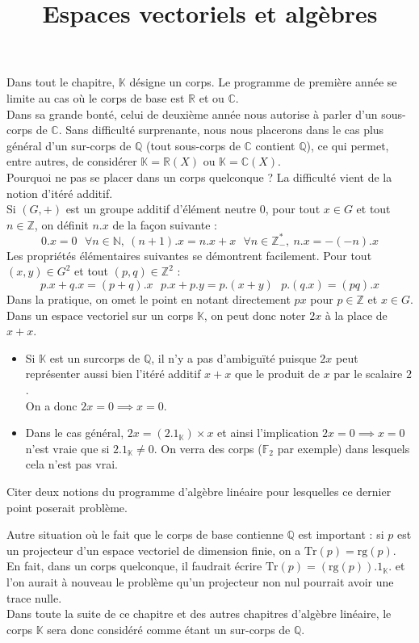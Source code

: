 \documentclass[french]{article}
\title{Espaces vectoriels et algèbres}
\date{}
\newcommand{\N}{\mathbb{N}}
\newcommand{\Z}{\mathbb{Z}}
\newcommand{\Q}{\mathbb{Q}}
\newcommand{\R}{\mathbb{R}}
\newcommand{\C}{\mathbb{C}}
\newcommand{\K}{\mathbb{K}}
\newcommand{\st}{^*}
\newcommand{\F}{\mathbb{F}}
\newcommand{\Tr}{\text{Tr}}
\newcommand{\rg}{\text{rg}}
\theoremstyle{plain}
\theoremstyle{definition}
\theoremstyle{remark}
\begin{document}
\tableofcontents

\newpage
\maketitle
Dans tout le chapitre, $\K$ désigne un corps. Le programme de première année se limite au cas où le corps de base est $\R$ et ou $\C$. \\
Dans sa grande bonté, celui de deuxième année nous autorise à parler d'un sous-corps de $\C$. Sans difficulté surprenante, nous nous placerons dans le cas plus général d'un sur-corps de $\Q$ (tout sous-corps de $\C$ contient $\Q$), ce qui permet, entre autres, de considérer $\K=\R(X)$ ou $\K=\C(X)$. \\
Pourquoi ne pas se placer dans un corps quelconque ? La difficulté vient de la notion d'itéré additif. \\
Si $(G,+)$ est un groupe additif d'élément neutre $0$, pour tout $x\in G$ et tout $n\in\Z$, on définit $n.x$ de la façon suivante : $$0.x=0\ \ \ \forall n\in\N,\ (n+1).x=n.x+x\ \ \ \forall n\in\Z_-\st,\ n.x=-(-n).x$$ Les propriétés élémentaires suivantes se démontrent facilement. Pour tout $(x,y)\in G^2$ et tout $(p,q)\in\Z^2$ : $$p.x+q.x=(p+q).x\ \ \ p.x+p.y=p.(x+y)\ \ \ p.(q.x)=(pq).x$$ Dans la pratique, on omet le point en notant directement $px$ pour $p\in\Z$ et $x\in G$. \\
Dans un espace vectoriel sur un corps $\K$, on peut donc noter $2x$ à la place de $x+x$.
\begin{itemize}
	\item Si $\K$ est un surcorps de $\Q$, il n'y a pas d'ambiguïté puisque $2x$ peut représenter aussi bien l'itéré additif $x+x$ que le produit de $x$ par le scalaire $2$.\\
	On a donc $2x=0\implies x=0$.
	\item Dans le cas général, $2x=(2.1_\K)\times x$ et ainsi l'implication $2x=0\implies x=0$ n'est vraie que si $2.1_\K\ne 0$. On verra des corps ($\F_2$ par exemple) dans lesquels cela n'est pas vrai.
\end{itemize}

\begin{exo}
	Citer deux notions du programme d'algèbre linéaire pour lesquelles ce dernier point poserait problème.
\end{exo}

Autre situation où le fait que le corps de base contienne $\Q$ est important : si $p$ est un projecteur d'un espace vectoriel de dimension finie, on a $\Tr(p)=\rg(p)$. En fait, dans un corps quelconque, il faudrait écrire $\Tr(p)=(\rg(p)).1_\K$. et l'on aurait à nouveau le problème qu'un projecteur non nul pourrait avoir une trace nulle. \\
Dans toute la suite de ce chapitre et des autres chapitres d'algèbre linéaire, le corps $\K$ sera donc considéré comme étant un sur-corps de $\Q$.
\end{document}
